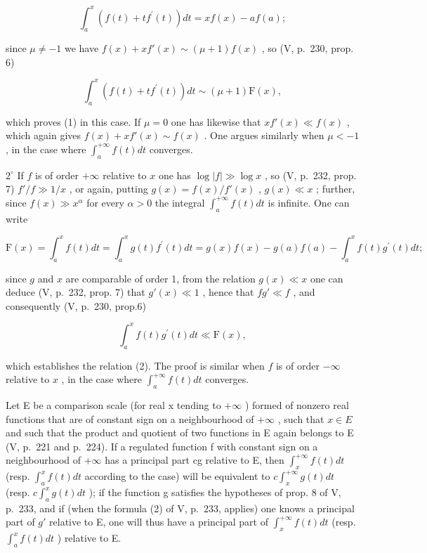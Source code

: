 \[
\int_ {a} ^ {x} \left(f (t) + t f ^ {\prime} (t)\right) d t = x f (x) - a f (a);
\]

since \(\mu \neq -1\) we have \(f(x) + xf'(x) \sim (\mu + 1)f(x)\) , so (V, p.~230, prop. 6)

\[
\int_ {a} ^ {x} \left(f (t) + t f ^ {\prime} (t)\right) d t \sim (\mu + 1) \mathrm{F} (x),
\]

which proves (1) in this case. If \(\mu = 0\) one has likewise that \(xf'(x) \ll f(x)\) , which again gives \(f(x) + xf'(x) \sim f(x)\) . One argues similarly when \(\mu < -1\) , in the case where \(\int_{a}^{+\infty} f(t) dt\) converges.

\(2^{\circ}\) If \(f\) is of order \(+\infty\) relative to \(x\) one has \(\log |f| \gg \log x\) , so (V, p.~232, prop. 7) \(f'/f \gg 1/x\) , or again, putting \(g(x) = f(x)/f'(x)\) , \(g(x) \ll x\) ; further, since \(f(x) \gg x^{\alpha}\) for every \(\alpha > 0\) the integral \(\int_{a}^{+\infty} f(t) dt\) is infinite. One can write

\[
\mathrm{F} (x) = \int_ {a} ^ {x} f (t) d t = \int_ {a} ^ {x} g (t) f ^ {\prime} (t) d t = g (x) f (x) - g (a) f (a) - \int_ {a} ^ {x} f (t) g ^ {\prime} (t) d t;
\]

since \(g\) and \(x\) are comparable of order 1, from the relation \(g(x) \ll x\) one can deduce (V, p.~232, prop. 7) that \(g'(x) \ll 1\) , hence that \(fg' \ll f\) , and consequently (V, p.~230, prop.6)

\[
\int_ {a} ^ {x} f (t) g ^ {\prime} (t) d t \ll \mathrm{F} (x),
\]

which establishes the relation (2). The proof is similar when \(f\) is of order \(-\infty\) relative to \(x\) , in the case where \(\int_{a}^{+\infty} f(t) dt\) converges.

Let E be a comparison scale (for real x tending to \(+\infty\) ) formed of nonzero real functions that are of constant sign on a neighbourhood of \(+\infty\) , such that \(x \in E\) and such that the product and quotient of two functions in E again belongs to E (V, p.~221 and p.~224). If a regulated function f with constant sign on a neighbourhood of \(+\infty\) has a principal part cg relative to E, then \(\int_{x}^{+\infty} f(t) dt\) (resp. \(\int_{a}^{x} f(t) dt\) according to the case) will be equivalent to \(c \int_{x}^{+\infty} g(t) dt\) (resp. \(c \int_{a}^{x} g(t) dt\) ); if the function g satisfies the hypotheses of prop. 8 of V, p.~233, and if (when the formula (2) of V, p.~233, applies) one knows a principal part of \(g'\) relative to E, one will thus have a principal part of \(\int_{x}^{+\infty} f(t) dt\) (resp. \(\int_{a}^{x} f(t) dt\) ) relative to E.

